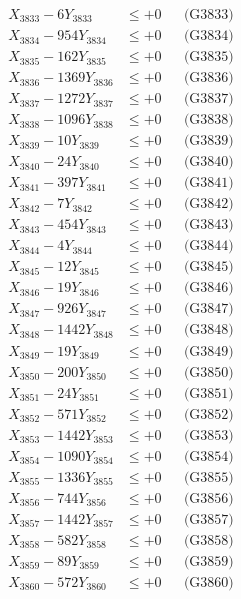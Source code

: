 \documentclass[a4paper,10pt]{article}
\begin{document}
{\begin{align}
X_{3833} - 6Y_{3833} &\leq +0 && \text{(G3833)} \\
X_{3834} - 954Y_{3834} &\leq +0 && \text{(G3834)} \\
X_{3835} - 162Y_{3835} &\leq +0 && \text{(G3835)} \\
X_{3836} - 1369Y_{3836} &\leq +0 && \text{(G3836)} \\
X_{3837} - 1272Y_{3837} &\leq +0 && \text{(G3837)} \\
X_{3838} - 1096Y_{3838} &\leq +0 && \text{(G3838)} \\
X_{3839} - 10Y_{3839} &\leq +0 && \text{(G3839)} \\
X_{3840} - 24Y_{3840} &\leq +0 && \text{(G3840)} \\
\allowbreak
X_{3841} - 397Y_{3841} &\leq +0 && \text{(G3841)} \\
X_{3842} - 7Y_{3842} &\leq +0 && \text{(G3842)} \\
X_{3843} - 454Y_{3843} &\leq +0 && \text{(G3843)} \\
X_{3844} - 4Y_{3844} &\leq +0 && \text{(G3844)} \\
X_{3845} - 12Y_{3845} &\leq +0 && \text{(G3845)} \\
X_{3846} - 19Y_{3846} &\leq +0 && \text{(G3846)} \\
X_{3847} - 926Y_{3847} &\leq +0 && \text{(G3847)} \\
X_{3848} - 1442Y_{3848} &\leq +0 && \text{(G3848)} \\
X_{3849} - 19Y_{3849} &\leq +0 && \text{(G3849)} \\
X_{3850} - 200Y_{3850} &\leq +0 && \text{(G3850)} \\
\allowbreak
X_{3851} - 24Y_{3851} &\leq +0 && \text{(G3851)} \\
X_{3852} - 571Y_{3852} &\leq +0 && \text{(G3852)} \\
X_{3853} - 1442Y_{3853} &\leq +0 && \text{(G3853)} \\
X_{3854} - 1090Y_{3854} &\leq +0 && \text{(G3854)} \\
X_{3855} - 1336Y_{3855} &\leq +0 && \text{(G3855)} \\
X_{3856} - 744Y_{3856} &\leq +0 && \text{(G3856)} \\
X_{3857} - 1442Y_{3857} &\leq +0 && \text{(G3857)} \\
X_{3858} - 582Y_{3858} &\leq +0 && \text{(G3858)} \\
X_{3859} - 89Y_{3859} &\leq +0 && \text{(G3859)} \\
X_{3860} - 572Y_{3860} &\leq +0 && \text{(G3860)} \\

\end{align}}
\end{document}
